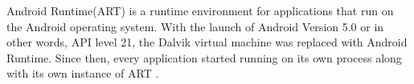 Android Runtime(ART) is a runtime environment for applications that run on the Android operating system. With the launch of Android Version 5.0 or in other words, API level 21, the Dalvik virtual machine was replaced with Android Runtime. Since then, every application started running on its own process along with its own instance of ART \cite{7}.